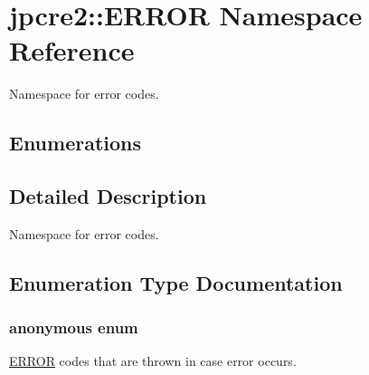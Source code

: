 \hypertarget{namespacejpcre2_1_1ERROR}{}\section{jpcre2\+:\+:E\+R\+R\+OR Namespace Reference}
\label{namespacejpcre2_1_1ERROR}


Namespace for error codes.  


\subsection*{Enumerations}


\subsection{Detailed Description}
Namespace for error codes. 

\subsection{Enumeration Type Documentation}
\subsubsection[{\texorpdfstring{anonymous enum}{anonymous enum}}]{\setlength{\rightskip}{0pt plus 5cm}anonymous enum}\hypertarget{namespacejpcre2_1_1ERROR_a4b2998984439438fa9da8d7043909bc2}{}\label{namespacejpcre2_1_1ERROR_a4b2998984439438fa9da8d7043909bc2}


\hyperlink{namespacejpcre2_1_1ERROR}{E\+R\+R\+OR} codes that are thrown in case error occurs. 

